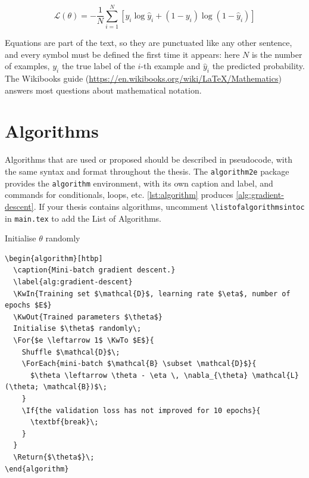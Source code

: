 \begin{equation}
  \mathcal{L}(\theta) = -\frac{1}{N} \sum_{i=1}^{N} \left[ y_i \log \hat{y}_i
                        + (1 - y_i) \log (1 - \hat{y}_i) \right]
  \label{eq:cross-entropy}
\end{equation}

Equations are part of the text, so they are punctuated like any other sentence, and every
symbol must be defined the first time it appears: here $N$ is the number of examples, $y_i$
the true label of the $i$-th example and $\hat{y}_i$ the predicted probability. The
Wikibooks guide (\url{https://en.wikibooks.org/wiki/LaTeX/Mathematics}) answers most
questions about mathematical notation.

\section{Algorithms}\label{sec:algorithms}

Algorithms that are used or proposed should be described in pseudocode, with the same
syntax and format throughout the thesis. The \texttt{algorithm2e} package provides the
\texttt{algorithm} environment, with its own caption and label, and commands for
conditionals, loops, etc. \autoref{lst:algorithm} produces \autoref{alg:gradient-descent}.
If your thesis contains algorithms, uncomment \verb|\listofalgorithmsintoc| in
\texttt{main.tex} to add the List of Algorithms.

\begin{algorithm}[htbp]
  \caption{Mini-batch gradient descent.}
  \label{alg:gradient-descent}
  Initialise $\theta$ randomly\;
  \Return{$\theta$}\;
\end{algorithm}

\begin{lstlisting}[language={[LaTeX]TeX}, caption={Describing an algorithm.}, label=lst:algorithm]
\begin{algorithm}[htbp]
  \caption{Mini-batch gradient descent.}
  \label{alg:gradient-descent}
  \KwIn{Training set $\mathcal{D}$, learning rate $\eta$, number of epochs $E$}
  \KwOut{Trained parameters $\theta$}
  Initialise $\theta$ randomly\;
  \For{$e \leftarrow 1$ \KwTo $E$}{
    Shuffle $\mathcal{D}$\;
    \ForEach{mini-batch $\mathcal{B} \subset \mathcal{D}$}{
      $\theta \leftarrow \theta - \eta \, \nabla_{\theta} \mathcal{L}(\theta; \mathcal{B})$\;
    }
    \If{the validation loss has not improved for 10 epochs}{
      \textbf{break}\;
    }
  }
  \Return{$\theta$}\;
\end{algorithm}
\end{lstlisting}

